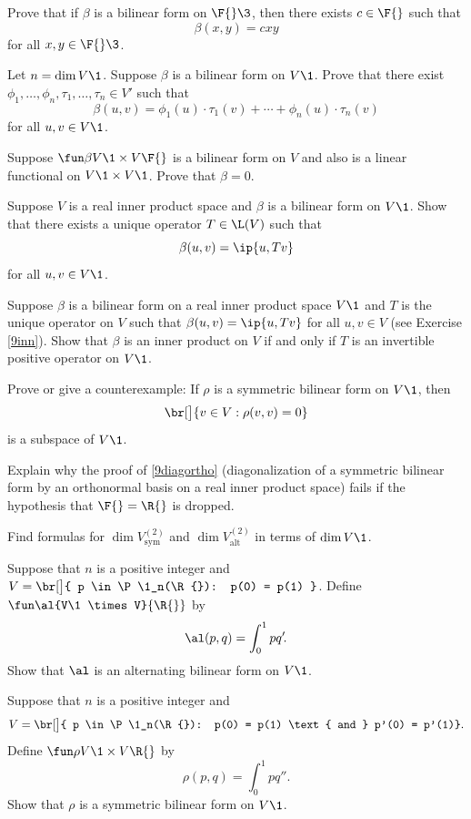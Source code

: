 
\exercise
Prove that if $\beta$ is a bilinear form on $\F{}\3$, then there exists $c \in \F{}$ such that
\[
\beta(x,y) = c x y
\]
for all $x, y \in \F{}\3$.


\exercise
Let $n = \dim V\1$. Suppose $\beta$ is a bilinear form on $V\1$. Prove that there exist
$\phi_1, \ldots, \phi_n, \tau_1, \ldots, \tau_n \in V'$ such that
\[
\beta(u, v) = \phi_1(u) \cdot \tau_1(v) + \cdots + \phi_n(u) \cdot \tau_n(v)
\]
for all $u, v \in V\1$.


\exercise
Suppose $\fun \beta {V\1 \times V} {\F{}}$ is a bilinear form on $V$ and also is a linear functional on $V\1 \times V\1$. Prove that
$\beta = 0$.\label{11zero}


\exercise
Suppose $V$ is a real inner product space and $\beta$ is a bilinear form on $V\1$. Show that there exists a unique operator $T \in \L(V)$ such that\label{9inn}
\[
\beta(u, v) = \ip{u,Tv}
\]
for all $u, v \in V\1$.


\exercise
Suppose $\beta$ is a bilinear form on a real inner product space $V\1$ and $T$ is the unique operator on $V$ such that $\beta(u,v) = \ip{u, Tv}$ for all $u, v \in V$ (see Exercise \ref{9inn}). Show that $\beta$ is an inner product on $V$ if and only if $T$ is an invertible positive operator on $V\1$.


\exercise
Prove or give a counterexample: If $\rho$ is a symmetric bilinear form on $V\1$, then
\[
\br[\big]{v \in V: \rho(v, v) = 0}
\]
is a subspace of $V\1$.


\exercise
Explain why the proof of \ref{9diagortho} (diagonalization of a symmetric bilinear form by an orthonormal basis on a real inner product space) fails if the hypothesis that $\F{} = \R{}$ is dropped.


\exercise
Find formulas for $\dim V^{(2)}_{\text{sym}}$ and $\dim V^{(2)}_{\text{alt}}$ in terms of $\dim V\1$.


\exercise
Suppose that $n$ is a positive integer and $V = \br[\big]{ p \in \P\1_n(\R{}): p(0) = p(1) }$.
Define $\fun \al {V\1 \times V} {\R{}}$ by
\[
\al(p,q) = \int_0^1 p q'\!.
\]
Show that $\al$ is an alternating bilinear form on $V\1$.


\exercise
Suppose that $n$ is a positive integer and
\[
V = \br[\big]{ p \in \P\1_n(\R{}): p(0) = p(1) \text{ and } p'(0) = p'(1)}.
\]
Define $\fun \rho {V\1 \times V} {\R{}}$ by
\[
\rho(p,q) = \int_0^1 p q''\!.
\]
Show that $\rho$ is a symmetric bilinear form on $V\1$.


